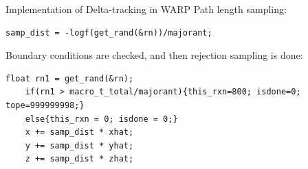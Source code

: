 \documentclass[xcolor=x11names, compress]{beamer}
\renewcommand{\(}{\begin{columns}}
\renewcommand{\)}{\end{columns}}
\newcommand{\<}[1]{\begin{column}{#1}}
\renewcommand{\>}{\end{column}}
\begin{document}
\begin{frame}{Implementation of Delta-tracking in WARP}
	Path length sampling:
	\vspace{2 mm}
	\begin{Verbatim}[fontsize=\footnotesize]
	samp_dist = -logf(get_rand(&rn))/majorant;
	\end{Verbatim}
	\pause
	\vspace{2 mm}
	Boundary conditions are checked, and then rejection sampling is done:
	\vspace{2 mm}
	\begin{Verbatim}[fontsize=\footnotesize]
	float rn1 = get_rand(&rn);
	if(rn1 > macro_t_total/majorant){this_rxn=800; isdone=0; tope=999999998;}
	else{this_rxn = 0; isdone = 0;}
	x += samp_dist * xhat;
	y += samp_dist * yhat;
	z += samp_dist * zhat;
	\end{Verbatim}
\end{frame}
\end{document}
